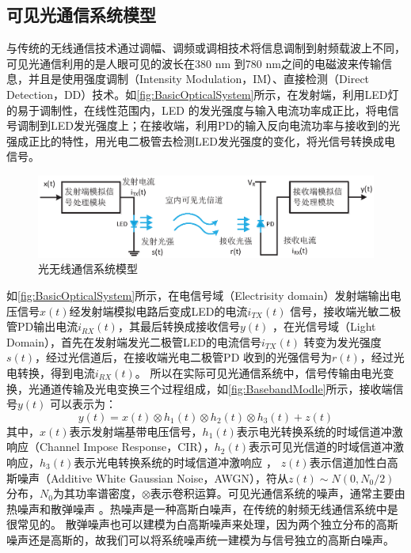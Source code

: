 \subsection{可见光通信系统模型}
与传统的无线通信技术通过调幅、调频或调相技术将信息调制到射频载波上不同，可见光通信利用的是人眼可见的波长在380 nm 到780 nm之间的电磁波来传输信息，并且是使用强度调制（Intensity Modulation，IM）、直接检测（Direct Detection，DD）技术。如\autoref{fig:BasicOpticalSystem}所示，在发射端，利用LED灯的易于调制性，在线性范围内，LED 的发光强度与输入电流功率成正比，将电信号调制到LED发光强度上；在接收端，利用PD的输入反向电流功率与接收到的光强成正比的特性，用光电二极管去检测LED发光强度的变化，将光信号转换成电信号。
\begin{figure}[htbp]
    \centering
    \includegraphics[width=\textwidth]{figures/chapter-2/BasicOpticalSystem.eps}
    \caption{光无线通信系统模型}
    \label{fig:BasicOpticalSystem}
\end{figure}
如\autoref{fig:BasicOpticalSystem}所示，在电信号域（Electrisity domain）发射端输出电压信号$x(t)$经发射端模拟电路后变成LED的电流$i_{TX}(t)$ 信号，接收端光敏二极管PD输出电流$i_{RX}(t)$，其最后转换成接收信号$y(t)$ ，在光信号域（Light Domain），首先在发射端发光二极管LED的电流信号$i_{TX}(t)$ 转变为发光强度$s(t)$，经过光信道后，在接收端光电二极管PD 收到的光强信号为$r(t)$，经过光电转换，得到电流$i_{RX}(t)$。
所以在实际可见光通信系统中，信号传输由电光变换，光通道传输及光电变换三个过程组成，如\autoref{fig:BasebandModle}所示，接收端信号$y(t)$ 可以表示为：
\begin{equation}
    y(t)=x(t)\otimes h_1(t)\otimes h_2(t)\otimes h_3(t)+z(t)
\end{equation}
其中，$x(t)$表示发射端基带电压信号，$h_1(t)$表示电光转换系统的时域信道冲激响应（Channel Impose Response，CIR），$h_2(t)$表示可见光信道的时域信道冲激响应，$h_3(t)$表示光电转换系统的时域信道冲激响应
\cite{Yangxuecheng2015}，
$z(t)$表示信道加性白高斯噪声（Additive White Gaussian Noise，AWGN），符从$z(t)\sim N(0,N_0/2)$分布，$N_0$为其功率谱密度，$\otimes$表示卷积运算。可见光通信系统的噪声，通常主要由热噪声和散弹噪声
\cite{Chenchunyan2014}。热噪声是一种高斯白噪声，在传统的射频无线通信系统中是很常见的。
散弹噪声也可以建模为白高斯噪声来处理，因为两个独立分布的高斯噪声还是高斯的，故我们可以将系统噪声统一建模为与信号独立的高斯白噪声。

